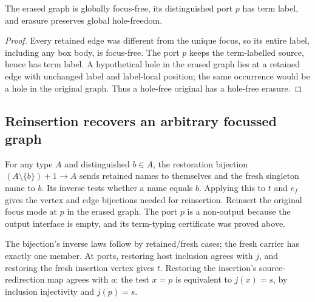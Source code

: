 \begin{lemma}
The erased graph is globally focus-free, its distinguished port $p$ has term
label, and erasure preserves global hole-freedom.
\end{lemma}
\begin{proof}
Every retained edge was different from the unique focus, so its entire label,
including any box body, is focus-free. The port $p$ keeps the term-labelled
source, hence has term label. A hypothetical hole in the erased graph lies at
a retained edge with unchanged label and label-local position; the same
occurrence would be a hole in the original graph. Thus a hole-free original
has a hole-free erasure.
\end{proof}

\subsection{Reinsertion recovers an arbitrary focussed graph}
\begin{definition}\label{term:focus-round-trip}
For any type $A$ and distinguished $b\in A$, the restoration bijection
$(A\setminus\{b\})+1\to A$ sends retained names to themselves and the fresh
singleton name to $b$. Its inverse tests whether a name equals $b$.
Applying this to $t$ and $e_f$ gives the vertex and edge bijections needed for
reinsertion. Reinsert the original focus mode at $p$ in the erased graph.
The port $p$ is a non-output because the output interface is empty, and its
term-typing certificate was proved above.
\end{definition}
The bijection's inverse laws follow by retained/fresh cases; the fresh carrier
has exactly one member. At ports, restoring host inclusion agrees with $j$,
and restoring the fresh insertion vertex gives $t$. Restoring the insertion's
source-redirection map agrees with $a$: the test $x=p$ is equivalent to
$j(x)=s$, by inclusion injectivity and $j(p)=s$.

